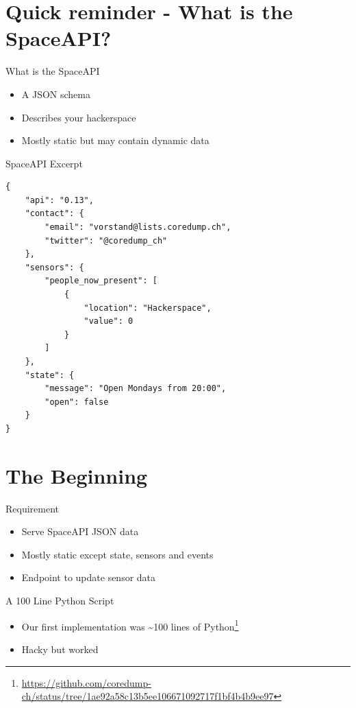 \section{Quick reminder - What is the SpaceAPI?}

\begin{frame}[c]{What is the SpaceAPI}
    \begin{itemize}
        \item A JSON schema
        \item Describes your hackerspace
        \item Mostly static but may contain dynamic data
    \end{itemize}
\end{frame}

\begin{frame}[fragile]{SpaceAPI Excerpt}
    \begin{verbatim}
{
    "api": "0.13",
    "contact": {
        "email": "vorstand@lists.coredump.ch",
        "twitter": "@coredump_ch"
    },
    "sensors": {
        "people_now_present": [
            {
                "location": "Hackerspace",
                "value": 0
            }
        ]
    },
    "state": {
        "message": "Open Mondays from 20:00",
        "open": false
    }
}
    \end{verbatim}
\end{frame}

\section{The Beginning}

\begin{frame}[c]{Requirement}
    \begin{itemize}
        \item Serve SpaceAPI JSON data
        \item Mostly static except state, sensors and events
        \item Endpoint to update sensor data
    \end{itemize}
\end{frame}

\begin{frame}[c]{A 100 Line Python Script}
    \begin{itemize}
			\item Our first implementation was \~{}100 lines of Python\footnote{\url{https://github.com/coredump-ch/status/tree/1ae92a58c13b5ee106671092717f1bf4b4b9ee97}}
        \item Hacky but worked
    \end{itemize}
\end{frame}

